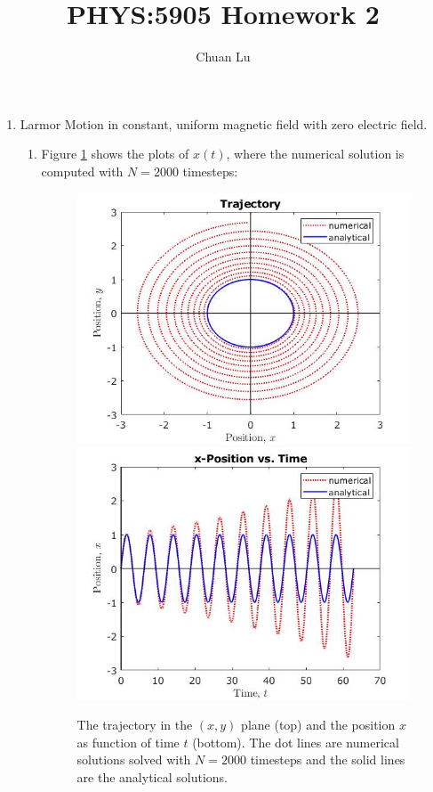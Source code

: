 \documentclass{article}
\begin{document}
\author{Chuan Lu}
\title{PHYS:5905 Homework 2}
\maketitle

\medskip

\begin{enumerate}

\item
Larmor Motion in constant, uniform magnetic field with zero electric field.

\begin{enumerate}
\item
Figure \ref{problem 1.1} shows the plots of $x(t)$, where the numerical solution is computed with $N=2000$ timesteps:
\begin{figure}[h]
\centering
\vbox{
\includegraphics[scale=0.6]{problem1/trajectory_timestep_2000.jpg}
\includegraphics[scale=0.6]{problem1/xposition_timestep_2000.jpg}
}
\caption{The trajectory in the $(x, y)$ plane (top) and the position $x$ as function of time $t$ (bottom). The dot lines are numerical solutions solved with $N=2000$ timesteps and the solid lines are the analytical solutions.}
\label{problem 1.1}
\end{figure}


\end{enumerate}
\end{enumerate}
\end{document}
